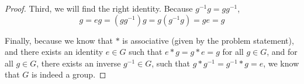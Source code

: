 \documentclass[a4paper]{article}
\begin{document}
\begin{myparindent}{0pt}
\begin{proof}
  Third, we will find the right identity. Because $g^{-1}g = gg^{-1}$,
  \[ g = eg = (gg^{-1})g = g(g^{-1}g) = ge = g \]

  Finally, because we know that $*$ is associative (given by the problem
  statement), and there exists an identity $e \in G$ such that
  $e * g = g * e = g$ for all $g \in G$, and for all $g \in G$, there exists
  an inverse $g^{-1} \in G$, such that $g * g^{-1} = g^{-1} * g = e$, we know
  that $G$ is indeed a group.
\end{proof}

\end{myparindent}
\end{document}
